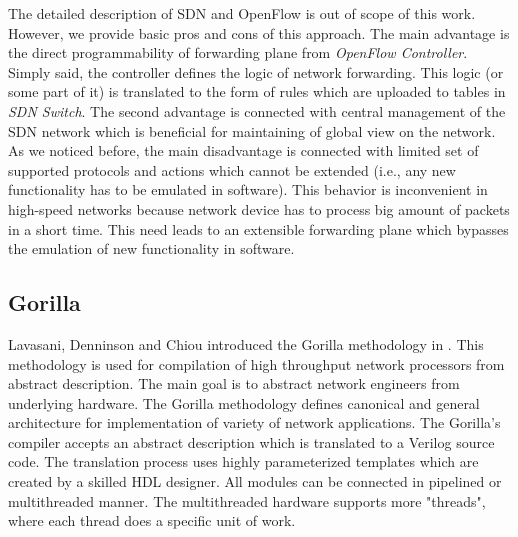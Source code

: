 The detailed description of SDN and OpenFlow is out of scope of this work. 
However, we provide basic pros and cons of this approach. The main advantage is the direct programmability of forwarding plane
from \textit{OpenFlow Controller}. Simply said, the controller defines the logic of network forwarding. This logic (or some part of it) is 
translated to the form of rules which are uploaded to tables in \textit{SDN Switch}. The second advantage is connected with central management
of the SDN network which is beneficial for maintaining of global view on the network.
As we noticed before, the main disadvantage is connected with limited set of supported protocols and actions which cannot be extended
(i.e., any new functionality has to be emulated in software). This behavior is inconvenient in high-speed networks because network
device has to process big amount of packets in a short time. This need leads to an extensible forwarding plane which bypasses
the emulation of new functionality in software.

\subsection{Gorilla}
%
Lavasani, Denninson and Chiou introduced the Gorilla methodology in \cite{GorillaFPGA2012}. This methodology is used for compilation of high throughput 
network processors from abstract description. 
The main goal is to abstract network engineers from underlying hardware. 
The Gorilla methodology defines canonical and general architecture for implementation of variety of network applications. 
The Gorilla's compiler accepts an abstract description which is translated to a Verilog source code. 
The translation process uses highly parameterized templates which are created by a skilled HDL designer. 
All modules can be connected in pipelined or multithreaded manner. 
The multithreaded hardware supports more "threads", where each thread does a specific unit of work.

